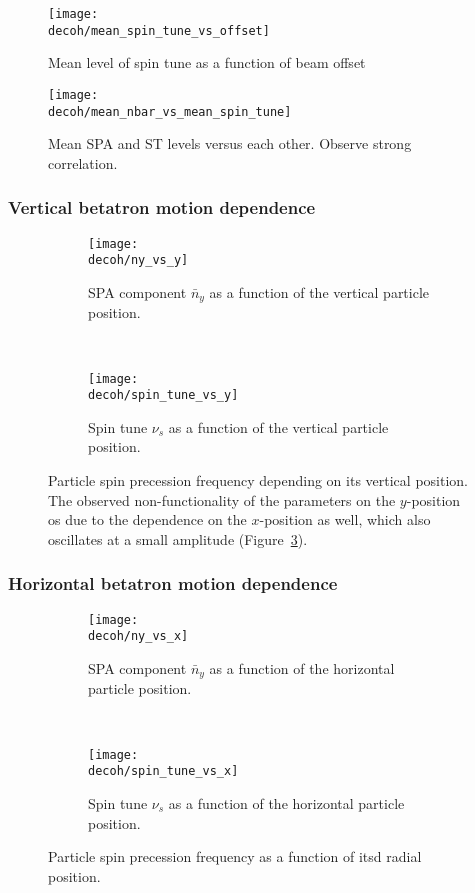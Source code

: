 \documentclass{beamer}
\newcommand{\home}{\string~}
\newcommand{\Artem}{\home/REPOS/COSYINF/img/Artem}
\newcommand{\decoh}{\Artem/decoherence_frequency_dependence}
\begin{document}
\begin{frame}
  \begin{figure}[H]
    \centering
    \texttt{[image: \\decoh/mean\_spin\_tune\_vs\_offset]}
    \caption{Mean level of spin tune as a function of beam offset}
  \end{figure}
\end{frame}

\begin{frame}
  \begin{figure}[H]
    \texttt{[image: \\decoh/mean\_nbar\_vs\_mean\_spin\_tune]}
    \caption{Mean SPA and ST levels versus each other. Observe strong correlation.\label{fig:mean_tune_axis}}
  \end{figure}
\end{frame}

\begin{frame}\frametitle{Vertical betatron motion dependence}
  \begin{figure}[H]
    \centering
    \begin{subfigure}[t]{.5\textwidth}
      \texttt{[image: \\decoh/ny\_vs\_y]}
      \caption{SPA component $\bar n_y$ as a function of the vertical particle position.}
    \end{subfigure}~
    \begin{subfigure}[t]{.5\textwidth}
      \texttt{[image: \\decoh/spin\_tune\_vs\_y]}
      \caption{Spin tune $\nu_s$ as a function of the vertical particle position.}
    \end{subfigure}
    \caption{Particle spin precession frequency depending on its vertical position.
      The observed non-functionality of the parameters on the $y$-position os due to the dependence on the $x$-position as well, which also oscillates at a small amplitude (Figure~\ref{fig:tune_axis_position_x}). \label{fig:tune_axis_position_y}}
  \end{figure}
\end{frame}

\begin{frame}\frametitle{Horizontal betatron motion dependence}
  \begin{figure}[H]
    \centering
    \begin{subfigure}[t]{.5\textwidth}
      \texttt{[image: \\decoh/ny\_vs\_x]}
      \caption{SPA component $\bar n_y$ as a function of the horizontal particle position.}
    \end{subfigure}~
    \begin{subfigure}[t]{.5\textwidth}
      \texttt{[image: \\decoh/spin\_tune\_vs\_x]}
      \caption{Spin tune $\nu_s$ as a function of the horizontal particle position.}
    \end{subfigure}
    \caption{Particle spin precession frequency as a function of itsd radial position.\label{fig:tune_axis_position_x}}
  \end{figure}
\end{frame}
\end{document}
